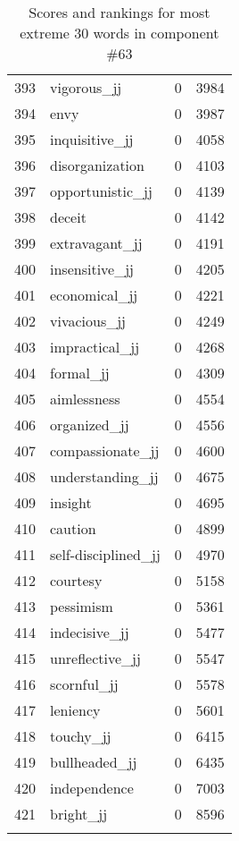 \begin{longtable}[!htbp]{| rlr@{.}l |}
    393 & vigorous\_jj & 0 & 3984 \\
    394 & envy & 0 & 3987 \\
    395 & inquisitive\_jj & 0 & 4058 \\
    396 & disorganization & 0 & 4103 \\
    397 & opportunistic\_jj & 0 & 4139 \\
    398 & deceit & 0 & 4142 \\
    399 & extravagant\_jj & 0 & 4191 \\
    400 & insensitive\_jj & 0 & 4205 \\
    401 & economical\_jj & 0 & 4221 \\
    402 & vivacious\_jj & 0 & 4249 \\
    403 & impractical\_jj & 0 & 4268 \\
    404 & formal\_jj & 0 & 4309 \\
    405 & aimlessness & 0 & 4554 \\
    406 & organized\_jj & 0 & 4556 \\
    407 & compassionate\_jj & 0 & 4600 \\
    408 & understanding\_jj & 0 & 4675 \\
    409 & insight & 0 & 4695 \\
    410 & caution & 0 & 4899 \\
    411 & self-disciplined\_jj & 0 & 4970 \\
    412 & courtesy & 0 & 5158 \\
    413 & pessimism & 0 & 5361 \\
    414 & indecisive\_jj & 0 & 5477 \\
    415 & unreflective\_jj & 0 & 5547 \\
    416 & scornful\_jj & 0 & 5578 \\
    417 & leniency & 0 & 5601 \\
    418 & touchy\_jj & 0 & 6415 \\
    419 & bullheaded\_jj & 0 & 6435 \\
    420 & independence & 0 & 7003 \\
    421 & bright\_jj & 0 & 8596 \\
    \hline
    \caption{Scores and rankings for most extreme 30 words in component \#63} \\
\end{longtable}
